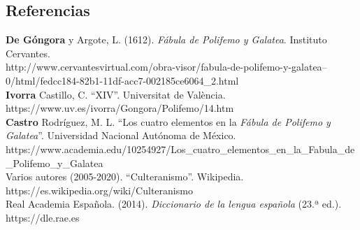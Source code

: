 \documentclass[12pt,a4paper]{article}
\begin{document}

\subsection{Referencias}

\textbf{De Góngora} y Argote, L. (1612). \textit{Fábula de Polifemo y Galatea}. Instituto Cervantes.\\
http://www.cervantesvirtual.com/obra-visor/fabula-de-polifemo-y-galatea--0/html/fedcc184-82b1-11df-acc7-002185ce6064_2.html\\

\textbf{Ivorra} Castillo, C. ``XIV''. Universitat de València.\\
https://www.uv.es/ivorra/Gongora/Polifemo/14.htm\\

\textbf{Castro} Rodríguez, M. L. ``Los cuatro elementos en la \textit{Fábula de Polifemo y Galatea}''. Universidad Nacional Autónoma de México.\\
https://www.academia.edu/10254927/Los_cuatro_elementos_en_la_Fabula_de_Polifemo_y_Galatea\\

Varios autores (2005-2020). ``Culteranismo''. Wikipedia.\\
https://es.wikipedia.org/wiki/Culteranismo\\

Real Academia Española. (2014). \textit{Diccionario de la lengua española} (23.ª ed.).\\
https://dle.rae.es\\
\end{document}
